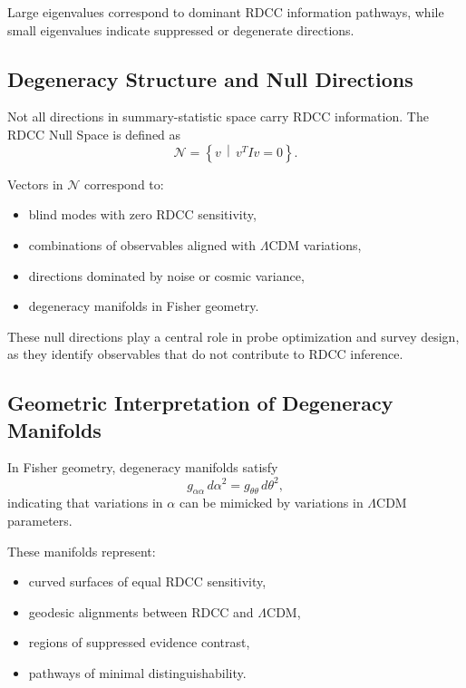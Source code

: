 \documentclass[11pt,a4paper]{article}
\begin{document}
Large eigenvalues correspond to dominant RDCC information pathways, while small
eigenvalues indicate suppressed or degenerate directions.

\subsection{Degeneracy Structure and Null Directions}

Not all directions in summary-statistic space carry RDCC information. The RDCC
Null Space is defined as
\begin{equation}
    \mathcal{N}
    =
    \left\{
        v \,\middle|\,
        v^{T} I v = 0
    \right\}.
\end{equation}

Vectors in $\mathcal{N}$ correspond to:

\begin{itemize}
    \item blind modes with zero RDCC sensitivity,
    \item combinations of observables aligned with $\Lambda$CDM variations,
    \item directions dominated by noise or cosmic variance,
    \item degeneracy manifolds in Fisher geometry.
\end{itemize}

These null directions play a central role in probe optimization and survey
design, as they identify observables that do not contribute to RDCC inference.

\subsection{Geometric Interpretation of Degeneracy Manifolds}

In Fisher geometry, degeneracy manifolds satisfy
\begin{equation}
    g_{\alpha\alpha}\,d\alpha^{2}
    =
    g_{\theta\theta}\,d\theta^{2},
\end{equation}
indicating that variations in $\alpha$ can be mimicked by variations in
$\Lambda$CDM parameters.

These manifolds represent:

\begin{itemize}
    \item curved surfaces of equal RDCC sensitivity,
    \item geodesic alignments between RDCC and $\Lambda$CDM,
    \item regions of suppressed evidence contrast,
    \item pathways of minimal distinguishability.
\end{itemize}
\end{document}
